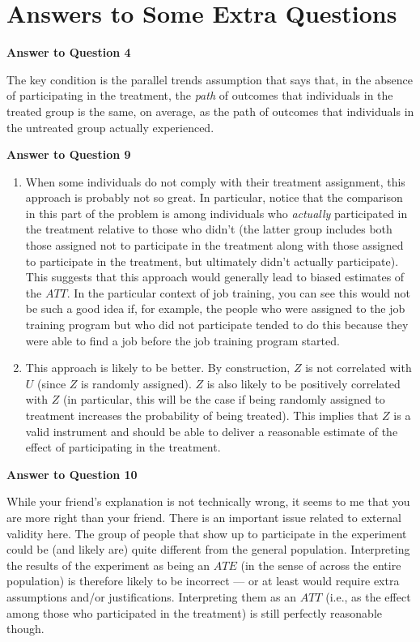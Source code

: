 \documentclass[
  letterpaper,
  DIV=11,
  numbers=noendperiod]{scrreprt}
\begin{document}
\section{Answers to Some Extra
Questions}\label{answers-to-some-extra-questions-2}

\textbf{Answer to Question 4}

The key condition is the parallel trends assumption that says that, in
the absence of participating in the treatment, the \emph{path} of
outcomes that individuals in the treated group is the same, on average,
as the path of outcomes that individuals in the untreated group actually
experienced.

\textbf{Answer to Question 9}

\begin{enumerate}
\def\labelenumi{\alph{enumi})}
\item
  When some individuals do not comply with their treatment assignment,
  this approach is probably not so great. In particular, notice that the
  comparison in this part of the problem is among individuals who
  \emph{actually} participated in the treatment relative to those who
  didn't (the latter group includes both those assigned not to
  participate in the treatment along with those assigned to participate
  in the treatment, but ultimately didn't actually participate). This
  suggests that this approach would generally lead to biased estimates
  of the \(ATT\). In the particular context of job training, you can see
  this would not be such a good idea if, for example, the people who
  were assigned to the job training program but who did not participate
  tended to do this because they were able to find a job before the job
  training program started.
\item
  This approach is likely to be better. By construction, \(Z\) is not
  correlated with \(U\) (since \(Z\) is randomly assigned). \(Z\) is
  also likely to be positively correlated with \(Z\) (in particular,
  this will be the case if being randomly assigned to treatment
  increases the probability of being treated). This implies that \(Z\)
  is a valid instrument and should be able to deliver a reasonable
  estimate of the effect of participating in the treatment.
\end{enumerate}

\textbf{Answer to Question 10}

While your friend's explanation is not technically wrong, it seems to me
that you are more right than your friend. There is an important issue
related to external validity here. The group of people that show up to
participate in the experiment could be (and likely are) quite different
from the general population. Interpreting the results of the experiment
as being an \(ATE\) (in the sense of across the entire population) is
therefore likely to be incorrect --- or at least would require extra
assumptions and/or justifications. Interpreting them as an \(ATT\)
(i.e., as the effect among those who participated in the treatment) is
still perfectly reasonable though.
\end{document}

